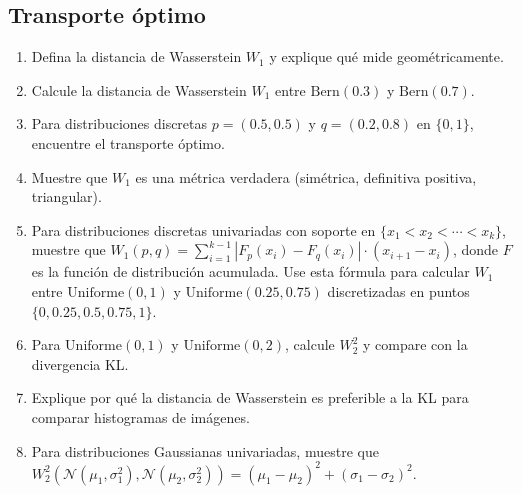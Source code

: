 \subsection*{Transporte óptimo}
\begin{enumerate}[resume]
	\item[$\star$] Defina la distancia de Wasserstein $W_1$ y explique qué mide geométricamente.
	\item[$\star\star$] Calcule la distancia de Wasserstein $W_1$ entre $\mathrm{Bern}(0.3)$ y $\mathrm{Bern}(0.7)$.
	\item[$\star\star$] Para distribuciones discretas $p = (0.5, 0.5)$ y $q = (0.2, 0.8)$ en $\{0, 1\}$, encuentre el transporte óptimo.
	\item[$\star\star\star$] Muestre que $W_1$ es una métrica verdadera (simétrica, definitiva positiva, triangular).
	\item[$\star\star\star$] Para distribuciones discretas univariadas con soporte en $\{x_1 < x_2 < \cdots < x_k\}$, muestre que $W_1(p,q) = \sum_{i=1}^{k-1} |F_p(x_i) - F_q(x_i)| \cdot (x_{i+1} - x_i)$, donde $F$ es la función de distribución acumulada. Use esta fórmula para calcular $W_1$ entre $\mathrm{Uniforme}(0,1)$ y $\mathrm{Uniforme}(0.25,0.75)$ discretizadas en puntos $\{0, 0.25, 0.5, 0.75, 1\}$.
	\item[$\star\star\star$] Para $\mathrm{Uniforme}(0,1)$ y $\mathrm{Uniforme}(0,2)$, calcule $W_2^2$ y compare con la divergencia KL.
	\item[$\star\star$] Explique por qué la distancia de Wasserstein es preferible a la KL para comparar histogramas de imágenes.
	\item[$\star\star\star$] Para distribuciones Gaussianas univariadas, muestre que $W_2^2(\mathcal{N}(\mu_1, \sigma_1^2), \mathcal{N}(\mu_2, \sigma_2^2)) = (\mu_1 - \mu_2)^2 + (\sigma_1 - \sigma_2)^2$.
\end{enumerate}

